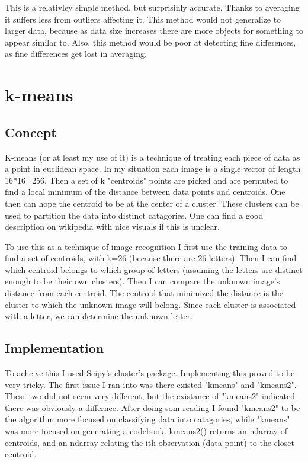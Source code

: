 \documentclass[a4paper]{article}
\begin{document}
\indent This is a relativley simple method, but surprisinly accurate. Thanks to averaging it suffers less from outliers affecting it. This method would not generalize to larger data, because as data size increases there are more objects for something to appear similar to. Also, this method would be poor at detecting fine differences, as fine differences get lost in averaging. 

\section{k-means}

\subsection{Concept}

\indent K-means (or at least my use of it) is a technique of treating each piece of data as a point in euclidean space. In my situation each image is a single vector of length 16*16=256. Then a set of k "centroids" points are picked and are permuted to find a local minimum of the distance between data points and centroids. One then can hope the centroid to be at the center of a cluster. These clusters can be used to partition the data into distinct catagories. One can find a good description on wikipedia with nice visuals if this is unclear.

To use this as a technique of image recognition I first use the training data to find a set of centroids, with k=26 (because there are 26 letters). Then I can find which centroid belongs to which group of letters (assuming the letters are distinct enough to be their own clusters). Then I can compare the unknown image's distance from each centroid. The centroid that minimized the distance is the cluster to which the unknown image will belong. Since each cluster is associated with a letter, we can determine the unknown letter.

\subsection{Implementation}

To acheive this I used Scipy's cluster's package. Implementing this proved to be very tricky. The first issue I ran into was there existed "kmeans" and "kmeans2". These two did not seem very different, but the existance of "kmeans2" indicated there was obviously a differnce. After doing som reading I found "kmeans2" to be the algorithm more focused on classifying data into catagories, while "kmeans" was more focused on generating a codebook. kmeans2() returns an ndarray of centroids, and an ndarray relating the ith observation (data point) to the closet centroid.
\end{document}
